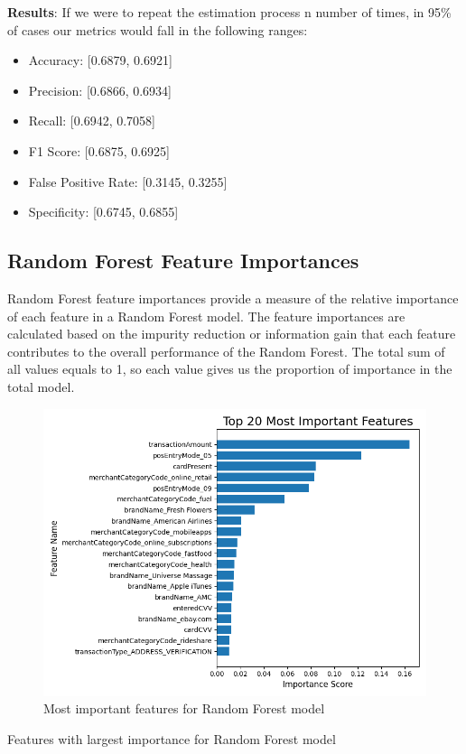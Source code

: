 \documentclass[12pt]{article}
\begin{document}
\textbf{Results}:
\noindent If we were to repeat the estimation process n number of times, in 95\% of cases our metrics would fall in the following ranges:
\begin{itemize}
  \item Accuracy: [0.6879, 0.6921]
  \item Precision: [0.6866, 0.6934]
  \item Recall: [0.6942, 0.7058]
  \item F1 Score: [0.6875, 0.6925]
  \item False Positive Rate: [0.3145, 0.3255]
  \item Specificity: [0.6745, 0.6855]
\end{itemize}

\subsection{Random Forest Feature Importances}
Random Forest feature importances provide a measure of the relative importance of each feature in a Random Forest model. The feature importances are calculated based on the impurity reduction or information gain that each feature contributes to the overall performance of the Random Forest. The total sum of all values equals to 1, so each value gives us the proportion of importance in the total model.

\begin{figure}[h]
    \centering
    \includegraphics[width=\textwidth]{images/rf_importance_scores.png}
    \caption{Most important features for Random Forest model}
    \label{fig:enter-label}
\end{figure}
\newpage
\begin{table}[h]
    \centering
    \resizebox{0.5\textwidth}{!}{%
     }
    \caption{Features with largest importance for Random Forest model}
    \label{tab:my_label}
\end{table}
\end{document}
